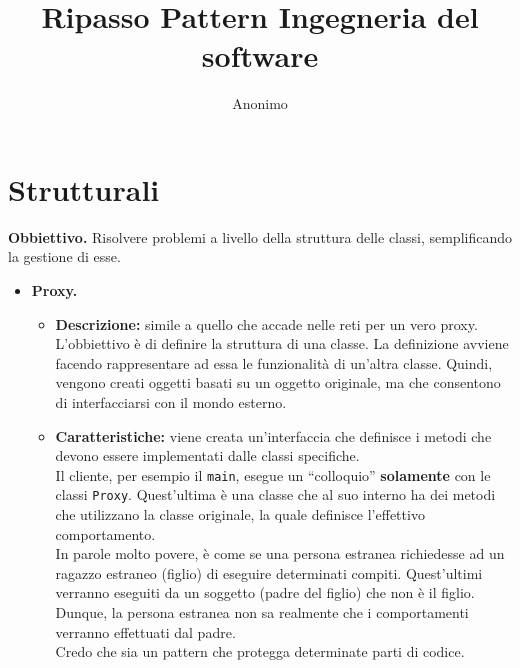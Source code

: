 \documentclass[a4paper,11pt]{article}
\begin{document}
\title{Ripasso Pattern Ingegneria del software}
\author{Anonimo}
\maketitle

\newpage

\tableofcontents	%

\newpage

\section{Strutturali}
\textcolor{Mahogany}{\textbf{Obbiettivo.}} Risolvere problemi a livello della struttura delle classi, semplificando la gestione di esse.
\begin{itemize}
	\item[\ding{42}] \textbf{Proxy.}
		\begin{itemize}
			\item \textbf{Descrizione:} simile a quello che accade nelle reti per un vero proxy. L'obbiettivo è di definire la struttura di una classe. La definizione avviene facendo rappresentare ad essa le funzionalità di un'altra classe. Quindi, vengono creati oggetti basati su un oggetto originale, ma che consentono di interfacciarsi con il mondo esterno.
			\item \textbf{Caratteristiche:} viene creata un'interfaccia che definisce i metodi che devono essere implementati dalle classi specifiche.\\
			Il cliente, per esempio il \texttt{main}, esegue un ``colloquio'' \textbf{solamente} con le classi \texttt{Proxy}. Quest'ultima è una classe che al suo interno ha dei metodi che utilizzano la classe originale, la quale definisce l'effettivo comportamento.\\
			In parole molto povere, è come se una persona estranea richiedesse ad un ragazzo estraneo (figlio) di eseguire determinati compiti. Quest'ultimi verranno eseguiti da un soggetto (padre del figlio) che non è il figlio. Dunque, la persona estranea non sa realmente che i comportamenti verranno effettuati dal padre.\\
			Credo che sia un pattern che protegga determinate parti di codice.
		\end{itemize}

\newpage


\end{itemize}
\end{document}
